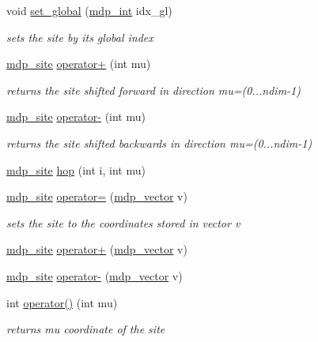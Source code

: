 \begin{DoxyCompactItemize}
void \hyperlink{classmdp__site_ad0b34065c28aa0abaaf5b742b459bc77}{set\_\-global} (\hyperlink{mdp__global__vars_8h_aaa1ad9d0dcd2124aa5af0120d9954174}{mdp\_\-int} idx\_\-gl)
\begin{DoxyCompactList}\small\item\em sets the site by its global index \item\end{DoxyCompactList}\item 
\hyperlink{classmdp__site}{mdp\_\-site} \hyperlink{classmdp__site_a86993407e982dc5dbc92cca7dfdaa536}{operator+} (int mu)
\begin{DoxyCompactList}\small\item\em returns the site shifted forward in direction mu=(0...ndim-\/1) \item\end{DoxyCompactList}\item 
\hyperlink{classmdp__site}{mdp\_\-site} \hyperlink{classmdp__site_a3dceebe7dec6a488314064cee7ef8d80}{operator-\/} (int mu)
\begin{DoxyCompactList}\small\item\em returns the site shifted backwards in direction mu=(0...ndim-\/1) \item\end{DoxyCompactList}\item 
\hyperlink{classmdp__site}{mdp\_\-site} \hyperlink{classmdp__site_a5982cae4c0bf2c255a978529dc6afe6c}{hop} (int i, int mu)
\item 
\hyperlink{classmdp__site}{mdp\_\-site} \hyperlink{classmdp__site_aa4931841d551417b526a2d2d22751471}{operator=} (\hyperlink{classmdp__vector}{mdp\_\-vector} v)
\begin{DoxyCompactList}\small\item\em sets the site to the coordinates stored in vector v \item\end{DoxyCompactList}\item 
\hyperlink{classmdp__site}{mdp\_\-site} \hyperlink{classmdp__site_a5fc9e1550603644416108c92cbf3cab8}{operator+} (\hyperlink{classmdp__vector}{mdp\_\-vector} v)
\item 
\hyperlink{classmdp__site}{mdp\_\-site} \hyperlink{classmdp__site_a20d26e5db480233e64bde96eb67180fc}{operator-\/} (\hyperlink{classmdp__vector}{mdp\_\-vector} v)
\item 
int \hyperlink{classmdp__site_abbbb7f94657ed5112919578d63a3272c}{operator()} (int mu)
\begin{DoxyCompactList}\small\item\em returns mu coordinate of the site \item\end{DoxyCompactList}\item 

\end{DoxyCompactItemize}
